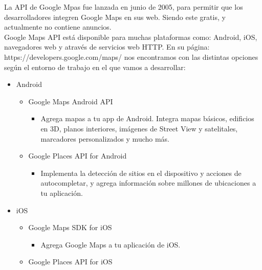 \documentclass[a4paper, 11pt]{article}
\begin{document}
\begin{itemize}
          La API de Google Mpas fue lanzada en junio de 2005, para permitir que
          los desarrolladores integren Google Maps en sus web. Siendo este gratis,
          y actualmente no contiene anuncios.\\


          Google Maps API está disponible para muchas plataformas como: Android,
          iOS, navegadores web y através de servicios web HTTP. En su página:
          https://developers.google.com/maps/ nos encontramos con las distintas
          opciones según el entorno de trabajo en el que vamos a desarrollar:\\

          \begin{itemize}
            \item{Android}
              \begin{itemize}
                  \item{Google Maps Android API}
                    \begin{itemize}
                        \item{Agrega mapas a tu app de Android. Integra mapas
                              básicos, edificios en 3D, planos interiores,
                              imágenes de Street View y satelitales, marcadores
                              personalizados y mucho más.}
                    \end{itemize}
                  \item{Google Places API for Android}
                    \begin{itemize}
                        \item{Implementa la detección de sitios en el
                              dispositivo y acciones de autocompletar, y agrega
                              información sobre millones de ubicaciones a tu
                              aplicación.}
                    \end{itemize}
              \end{itemize}
            \item{iOS}
              \begin{itemize}
                  \item{Google Maps SDK for iOS}
                    \begin{itemize}
                        \item{Agrega Google Maps a tu aplicación de iOS.}
                    \end{itemize}
                  \item{Google Places API for iOS}

\end{itemize}
\end{itemize}
\end{itemize}
\end{document}
